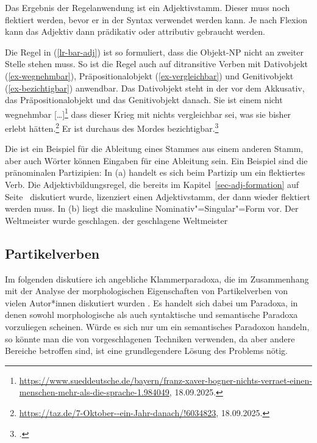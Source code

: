 Das Ergebnis der Regelanwendung ist ein Adjektivstamm. Dieser muss noch flektiert werden, 
bevor er in der Syntax verwendet werden kann. Je nach Flexion kann das Adjektiv dann
prädikativ oder attributiv gebraucht werden.

Die Regel in (\ref{lr-bar-adj}) ist so formuliert, dass die Objekt-NP nicht an zweiter Stelle stehen
muss. So ist die Regel auch auf ditransitive Verben mit Dativobjekt (\ref{ex-wegnehmbar}),
Präpositionalobjekt (\ref{ex-vergleichbar}) und Genitivobjekt (\ref{ex-bezichtigbar}) anwendbar. Das Dativobjekt steht in der \argstl vor dem
Akkusativ, das Präpositionalobjekt und das Genitivobjekt danach.
\eal
\ex\label{ex-wegnehmbar}
Sie ist einem nicht wegnehmbar [\ldots]\footnote{
  \url{https://www.sueddeutsche.de/bayern/franz-xaver-bogner-nichts-verraet-einen-menschen-mehr-als-die-sprache-1.984049},
  18.09.2025.
}
\ex\label{ex-vergleichbar}
dass dieser Krieg mit nichts vergleichbar sei, was sie bisher erlebt hätten.\footnote{
  \url{https://taz.de/7-Oktober--ein-Jahr-danach/!6034823}, 18.09.2025.
}
\ex\label{ex-bezichtigbar}
Er ist durchaus des Mordes bezichtigbar.\footnote{
.
}
\zl

\noindent
Die \bard ist ein Beispiel für die Ableitung eines Stammes aus einem anderen Stamm, aber auch Wörter
können Eingaben für eine Ableitung sein. Ein Beispiel sind die pränominalen Partizipien: In (a) handelt es sich
beim Partizip um ein flektiertes Verb. Die Adjektivbildungsregel, die bereits im Kapitel~\ref{sec-adj-formation}
auf Seite~\pageref{lr-adjective-formation-da-approach} diskutiert wurde, lizenziert einen Adjektivstamm, der dann wieder
flektiert werden muss. In (b) liegt die maskuline Nominativ"=Singular"=Form vor.
\eal
\ex Der Weltmeister wurde geschlagen.
\ex der geschlagene Weltmeister
\zl
{}


\subsection{Partikelverben}
\label{morph-pv}

Im folgenden diskutiere ich angebliche Klammerparadoxa, die im Zusammenhang mit der Analyse der
morphologischen Eigenschaften von Partikelverben von vielen Autor*innen diskutiert wurden
\parencites[z.\,B.][]{Bierwisch87a}[]{SW94a}[]{Stiebels96a}[104--105]{Luedeling2001a}. Es handelt sich
dabei um Paradoxa, in denen sowohl morphologische als auch syntaktische und semantische Paradoxa vorzuliegen
scheinen. Würde es sich nur um ein semantisches Paradoxon handeln, so könnte man die von \citet{Egg2004a}
vorgeschlagenen Techniken verwenden, da aber andere Bereiche betroffen sind, ist eine grundlegendere Lösung
des Problems nötig.

